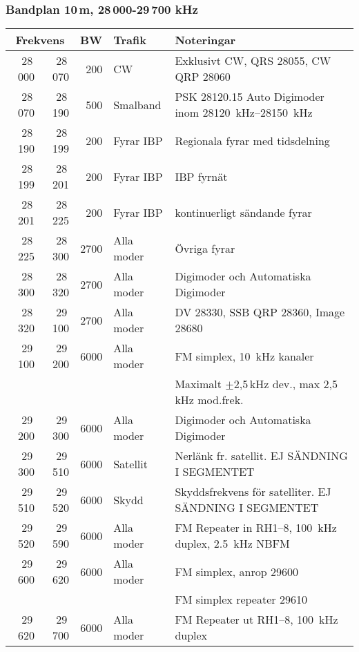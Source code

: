 \subsubsection{Bandplan 10\,m, 28\,000-29\,700 kHz}
\begin{tabular}{rrrll}
\multicolumn{2}{c}{\textbf{Frekvens}} & \textbf{BW} & \textbf{Trafik} & \textbf{Noteringar} \\ \hline

28\,000 & 28\,070 & 200  & CW         & Exklusivt CW, QRS \num{28055}, CW QRP \num{28060}                  \\ \hline
28\,070 & 28\,190 & 500  & Smalband   & PSK \num{28120,15} Auto Digimoder inom \SIrange{28120}{28150}{\kilo\hertz} \\ \hline
28\,190 & 28\,199 & 200  & Fyrar IBP  & Regionala fyrar med tidsdelning                                    \\ \hline
28\,199 & 28\,201 & 200  & Fyrar IBP  & IBP fyrnät                                                         \\ \hline
28\,201 & 28\,225 & 200  & Fyrar IBP  & kontinuerligt sändande fyrar                                       \\ \hline
28\,225 & 28\,300 & 2700 & Alla moder & Övriga fyrar                                                       \\ \hline
28\,300 & 28\,320 & 2700 & Alla moder & Digimoder och Automatiska Digimoder                                \\ \hline
28\,320 & 29\,100 & 2700 & Alla moder & DV \num{28330}, SSB QRP \num{28360}, Image \num{28680}{}           \\
29\,100 & 29\,200 & 6000 & Alla moder & FM simplex, \SI{10}{\kilo\hertz} kanaler                                   \\
        &         &      &            & Maximalt $\pm$2,5\,kHz dev., max 2,5\,kHz mod.frek.                \\ \hline
29\,200 & 29\,300 & 6000 & Alla moder & Digimoder och Automatiska Digimoder                                \\ \hline
29\,300 & 29\,510 & 6000 & Satellit   & Nerlänk fr. satellit. EJ SÄNDNING I SEGMENTET                      \\ \hline
29\,510 & 29\,520 & 6000 & Skydd      & Skyddsfrekvens för satelliter. EJ SÄNDNING I SEGMENTET             \\ \hline
29\,520 & 29\,590 & 6000 & Alla moder & FM Repeater in RH1--8, \SI{100}{\kilo\hertz} duplex, \SI{2,5}{\kilo\hertz} NBFM    \\ \hline
29\,600 & 29\,620 & 6000 & Alla moder & FM simplex, anrop \num{29600}                                      \\
        &         &      &            & FM simplex repeater \num{29610}                                    \\ \hline
29\,620 & 29\,700 & 6000 & Alla moder & FM Repeater ut RH1--8, \SI{100}{\kilo\hertz} duplex                       \\ \hline
\end{tabular}
\newpage

